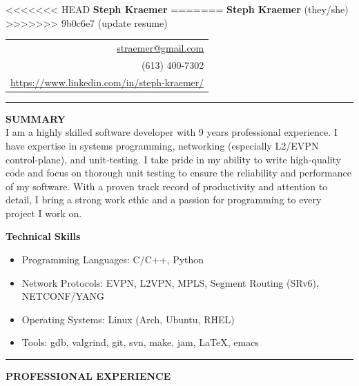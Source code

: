 \documentclass{letter}
\begin{document}
<<<<<<< HEAD
{\Huge\bf Steph Kraemer} \hfill
=======
{\Huge\bf Steph Kraemer} (they/she) \hfill
>>>>>>> 9b0c6e7 (update resume)
\begin{tabular}{r}
  \href{mailto:straemer@gmail.com}{straemer@gmail.com} \\
  (613) 400-7302 \\
  \href{https://www.linkedin.com/in/steph-kraemer/}{https://www.linkedin.com/in/steph-kraemer/}
\end{tabular}

\vskip 2pt
\hrule

{\large\bf SUMMARY} \\
I am a highly skilled software developer with 9 years professional experience. I have expertise in systems programming, networking (especially L2/EVPN control-plane), and unit-testing. I take pride in my ability to write high-quality code and focus on thorough unit testing to ensure the reliability and performance of my software. With a proven track record of productivity and attention to detail, I bring a strong work ethic and a passion for programming to every project I work on.
\vskip 2pt

{\bf Technical Skills}

\begin{itemize}
  \item Programming Languages: C/C++, Python
  \item Network Protocols: EVPN, L2VPN, MPLS, Segment Routing (SRv6), NETCONF/YANG
  \item Operating Systems: Linux (Arch, Ubuntu, RHEL)
  \item Tools: gdb, valgrind, git, svn, make, jam, LaTeX, emacs
\end{itemize}

\vskip 2pt
\hrule
{\large\bf PROFESSIONAL EXPERIENCE}
\end{document}
